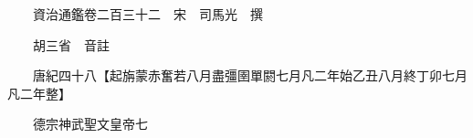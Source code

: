










 


 
 


 

  
  
  
  
  





  
  
  
  
  
 
  

  

  
  
  



  

 
 

  
   




  

  
  


  　　資治通鑑卷二百三十二　宋　司馬光　撰

　　胡三省　音註

　　唐紀四十八【起旃蒙赤奮若八月盡彊圉單閼七月凡二年始乙丑八月終丁卯七月凡二年整】

　　德宗神武聖文皇帝七


